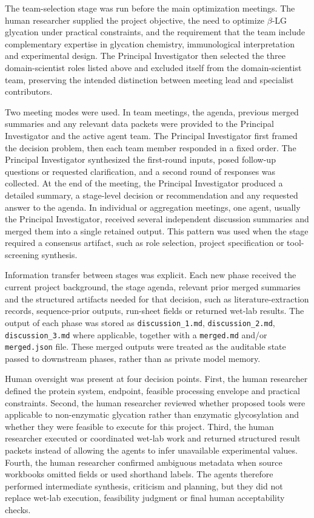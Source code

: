 The team-selection stage was run before the main optimization meetings. The
human researcher supplied the project objective, the need to optimize
$\beta$-LG glycation under practical constraints, and the requirement that the
team include complementary expertise in glycation chemistry, immunological
interpretation and experimental design. The Principal Investigator then selected
the three domain-scientist roles listed above and excluded itself from the
domain-scientist team, preserving the intended distinction between meeting lead
and specialist contributors.

Two meeting modes were used. In team meetings, the agenda, previous merged
summaries and any relevant data packets were provided to the Principal
Investigator and the active agent team. The Principal Investigator first framed
the decision problem, then each team member responded in a fixed order. The
Principal Investigator synthesized the first-round inputs, posed follow-up
questions or requested clarification, and a second round of responses was
collected. At the end of the meeting, the Principal Investigator produced a
detailed summary, a stage-level decision or recommendation and any requested
answer to the agenda. In individual or aggregation meetings, one agent, usually
the Principal Investigator, received several independent discussion summaries and
merged them into a single retained output. This pattern was used when the stage
required a consensus artifact, such as role selection, project specification or
tool-screening synthesis.

Information transfer between stages was explicit. Each new phase received the
current project background, the stage agenda, relevant prior merged summaries and
the structured artifacts needed for that decision, such as literature-extraction
records, sequence-prior outputs, run-sheet fields or returned wet-lab results.
The output of each phase was stored as \texttt{discussion\_1.md},
\texttt{discussion\_2.md}, \texttt{discussion\_3.md} where applicable, together
with a \texttt{merged.md} and/or \texttt{merged.json} file. These merged outputs
were treated as the auditable state passed to downstream phases, rather than as
private model memory.

Human oversight was present at four decision points. First, the human researcher
defined the protein system, endpoint, feasible processing envelope and practical
constraints. Second, the human researcher reviewed whether proposed tools were
applicable to non-enzymatic glycation rather than enzymatic glycosylation and
whether they were feasible to execute for this project. Third, the human
researcher executed or coordinated wet-lab work and returned structured result
packets instead of allowing the agents to infer unavailable experimental values.
Fourth, the human researcher confirmed ambiguous metadata when source workbooks
omitted fields or used shorthand labels. The agents therefore performed
intermediate synthesis, criticism and planning, but they did not replace wet-lab
execution, feasibility judgment or final human acceptability checks.

